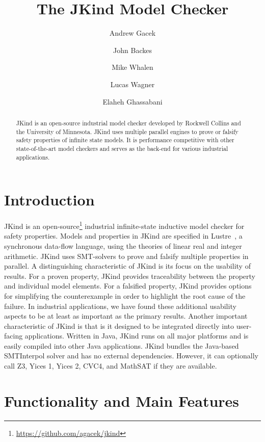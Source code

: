 \documentclass{llncs}
\title{The JKind Model Checker}
\author{
  Andrew Gacek\inst{1} \and
  John Backes\inst{1} \and
  Mike Whalen\inst{2} \and
  Lucas Wagner\inst{1} \and
  Elaheh Ghassabani\inst{2}}
\institute{
  Rockwell Collins \\
  \and
  University of Minnesota
}
\newcommand{\jkind}{{\sc JKind}\xspace}
\newcommand{\lustre}{{\sc Lustre}\xspace}
\begin{document}
\maketitle

\begin{abstract}
  \jkind is an open-source industrial model checker developed by
  Rockwell Collins and the University of Minnesota. \jkind uses
  multiple parallel engines to prove or falsify safety properties of
  infinite state models. It is performance competitive with other
  state-of-the-art model checkers and serves as the back-end for
  various industrial applications.
\end{abstract}

\section{Introduction}

\jkind is an
open-source\footnote{\url{https://github.com/agacek/jkind}} industrial
infinite-state inductive model checker for safety properties. Models
and properties in \jkind are specified in
\lustre~\cite{halbwachs1991ieee}, a synchronous data-flow language,
using the theories of linear real and integer arithmetic. \jkind uses
SMT-solvers to prove and falsify multiple properties in parallel.
%
A distinguishing characteristic of \jkind is its focus on the usability  of results. For a proven property, \jkind provides traceability between the property and individual model elements. For a falsified property, \jkind provides options for simplifying the
counterexample in order to highlight the root cause of the failure. In industrial applications, we have found these additional usability aspects to be at least as important as the primary results.
%
Another important characteristic of \jkind is that is it designed to be integrated directly into user-facing applications. Written in Java, \jkind runs on all major platforms and is easily compiled into other Java applications. \jkind bundles the Java-based {\sc SMTInterpol} solver and has no external dependencies. However, it can optionally call {\sc Z3}, {\sc Yices 1}, {\sc Yices 2}, {\sc CVC4}, and {\sc
  MathSAT} if they are available.

\section{Functionality and Main Features}
\end{document}
